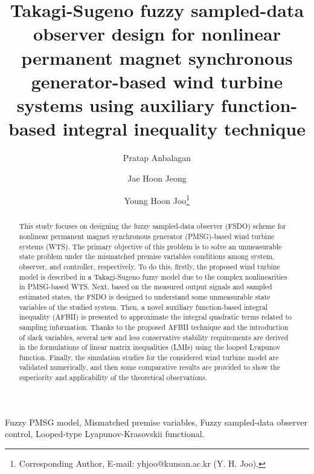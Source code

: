 \documentclass[preprint,11pt]{elsarticle}
\begin{document}
\begin{frontmatter}

\title{{Takagi-Sugeno} fuzzy sampled-data observer design for nonlinear permanent magnet synchronous generator-based wind turbine systems using auxiliary function-based integral inequality technique}

 \author[label1]{Pratap Anbalagan}
 \author[label1]{Jae Hoon Jeong}
 \author[label1]{Young Hoon Joo\footnote{Corresponding Author, E-mail: yhjoo@kunsan.ac.kr (Y. H. Joo).}}
 \address[label1]{School of IT Information and Control Engineering,
 Kunsan National University, 588 Daehak-ro, Gunsan-si, Jeonbuk 54150, Republic of Korea.}

\begin{abstract}
This study focuses on designing the fuzzy sampled-data observer (FSDO) scheme for nonlinear permanent magnet synchronous generator (PMSG)-based wind turbine systems (WTS). The primary objective of this problem is to solve an unmeasurable state problem under the mismatched premise variables conditions among system, observer, and controller, respectively. To do this, firstly, the proposed wind turbine model is described in a Takagi-Sugeno fuzzy model due to the complex nonlinearities in PMSG-based WTS. Next, based on the measured output signals and sampled estimated states, the FSDO is designed to understand some unmeasurable state variables of the studied system. Then, a novel auxiliary function-based integral inequality (AFBII) is presented to approximate the integral quadratic terms related to sampling information. Thanks to the proposed AFBII technique and the introduction of slack variables, several new and less conservative stability requirements are derived in the formulations of linear matrix inequalities (LMIs) using the looped Lyapunov function. Finally, the simulation studies for the considered wind turbine model are validated numerically, and then some comparative results are provided to show the superiority and applicability of the theoretical
observations.
\end{abstract}
\begin{keyword}
Fuzzy PMSG model, Mismatched premise variables, Fuzzy sampled-data observer control, Looped-type Lyapunov-Krasovskii functional.
\end{keyword}
\end{frontmatter}
\end{document}
